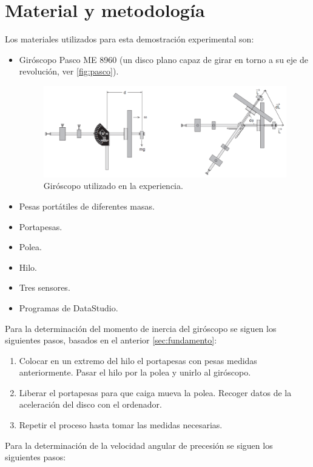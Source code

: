 \documentclass[a4paper]{article}
\begin{document}
\section{Material y metodología} \label{sec:metodo}
Los materiales utilizados para esta demostración experimental son:
\begin{itemize}
\item Giróscopo Pasco ME 8960 (un disco plano capaz de girar en torno a su eje de revolución, ver \autoref{fig:pasco}).
\begin{figure}[h]
\begin{center}
\includegraphics[width=12cm]{disco2.png}
\caption{Giróscopo utilizado en la experiencia.}
\label{fig:pasco}
\end{center}
\end{figure}
\item Pesas portátiles de diferentes masas.
\item Portapesas.
\item Polea.
\item Hilo.
\item Tres sensores.
\item Programas de DataStudio.
\end{itemize}
Para la determinación del momento de inercia del giróscopo se siguen los siguientes pasos, basados en el anterior \autoref{sec:fundamento}:
\begin{enumerate}
\item Colocar en un extremo del hilo el portapesas con pesas medidas anteriormente. Pasar el hilo por la polea y unirlo al giróscopo.
\item Liberar el portapesas para que caiga mueva la polea. Recoger datos de la aceleración del disco con el ordenador. 
\item Repetir el proceso hasta tomar las medidas necesarias.
\end{enumerate}
Para la determinación de la velocidad angular de precesión se siguen los siguientes pasos:
\end{document}
